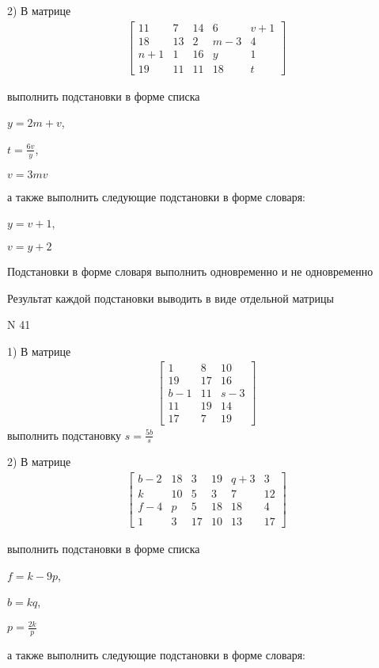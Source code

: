 \documentclass[11pt]{report}
\begin{document}
    2) В матрице
\begin{align*}
\left[\begin{matrix}11 & 7 & 14 & 6 & v + 1\\18 & 13 & 2 & m - 3 & 4\\n + 1 & 1 & 16 & y & 1\\19 & 11 & 11 & 18 & t\end{matrix}\right]
\end{align*}

выполнить подстановки в форме списка

$y=2 m + v$,

$t=\frac{6 v}{y}$,

$v=3 m v$

а также выполнить следующие подстановки в форме словаря:

$y=v + 1$,

$v=y + 2$


    Подстановки в форме словаря выполнить одновременно и не одновременно


    Результат каждой подстановки выводить в виде отдельной матрицы

\newpage
N 41


    1) В матрице
\begin{align*}
\left[\begin{matrix}1 & 8 & 10\\19 & 17 & 16\\b - 1 & 11 & s - 3\\11 & 19 & 14\\17 & 7 & 19\end{matrix}\right]
\end{align*}
выполнить подстановку $s=\frac{5 b}{s}$


    2) В матрице
\begin{align*}
\left[\begin{matrix}b - 2 & 18 & 3 & 19 & q + 3 & 3\\k & 10 & 5 & 3 & 7 & 12\\f - 4 & p & 5 & 18 & 18 & 4\\1 & 3 & 17 & 10 & 13 & 17\end{matrix}\right]
\end{align*}

выполнить подстановки в форме списка

$f=k - 9 p$,

$b=k q$,

$p=\frac{2 k}{p}$

а также выполнить следующие подстановки в форме словаря:
\end{document}
